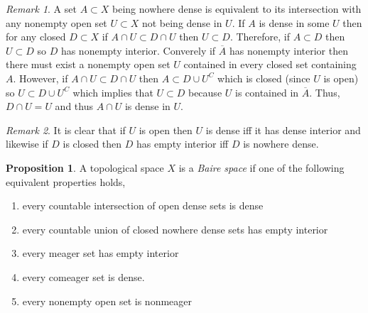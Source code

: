 \documentclass{article}
\theoremstyle{theorem}
\theoremstyle{definition}
\theoremstyle{definition}
\newtheorem*{proposition}{Proposition}
\theoremstyle{remark}
\theoremstyle{definition}
\theoremstyle{remark}
\newtheorem{remark}{Remark}[subsection]
\begin{document}
\begin{remark}
A set $A \subset X$ being nowhere dense is equivalent to its intersection with any nonempty open set $U \subset X$ not being dense in $U$. If $A$ is dense in some $U$ then for any closed $D \subset X$ if $A \cap U \subset D \cap U$ then $U \subset D$. Therefore, if $A \subset D$ then $U \subset D$ so $D$ has nonempty interior. Converely if $\overline{A}$ has nonempty interior then there must exist a nonempty open set $U$ contained in every closed set containing $A$. However, if $A \cap U \subset D \cap U$ then $A \subset D \cup U^C$ which is closed (since $U$ is open) so $U \subset D \cup U^C$ which implies that $U \subset D$ because $U$ is contained in $\overline{A}$. Thus, $D \cap U = U$ and thus $A \cap U$ is dense in $U$.  
\end{remark}

\begin{remark}
It is clear that if $U$ is open then $U$ is dense iff it has dense interior and likewise if $D$ is closed then $D$ has empty interior iff $D$ is nowhere dense. 
\end{remark}

\begin{proposition}
A topological space $X$ is a \textit{Baire space} if one of the following equivalent properties holds,
\begin{enumerate}
\item every countable intersection of open dense sets is dense
\item every countable union of closed nowhere dense sets has empty interior
\item every meager set has empty interior
\item every comeager set is dense.
\item every nonempty open set is nonmeager
\end{enumerate}
\end{proposition}
\end{document}
